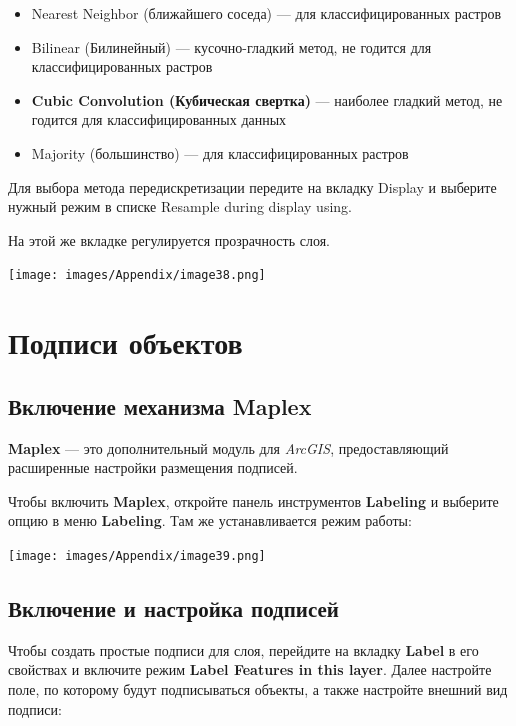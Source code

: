\documentclass[12pt,]{book}
\begin{document}
\begin{itemize}
\item
  Nearest Neighbor (ближайшего соседа) --- для классифицированных растров
\item
  Bilinear (Билинейный) --- кусочно-гладкий метод, не годится для классифицированных растров
\item
  \textbf{Cubic Convolution (Кубическая свертка)} --- наиболее гладкий метод, не годится для классифицированных данных
\item
  Majority (большинство) --- для классифицированных растров
\end{itemize}

Для выбора метода передискретизации передите на вкладку Display и выберите нужный режим в списке Resample during display using.

На этой же вкладке регулируется прозрачность слоя.

\texttt{[image: images/Appendix/image38.png]}

\hypertarget{manual-labels}{%
\chapter{Подписи объектов}\label{manual-labels}}

\hypertarget{maplex}{%
\section{Включение механизма Maplex}\label{maplex}}

\textbf{Maplex} --- это дополнительный модуль для \emph{ArcGIS}, предоставляющий расширенные настройки размещения подписей.

Чтобы включить \textbf{Maplex}, откройте панель инструментов \textbf{Labeling} и выберите опцию в меню \textbf{Labeling}. Там же устанавливается режим работы:

\texttt{[image: images/Appendix/image39.png]}

\hypertarget{section-24}{%
\section{Включение и настройка подписей}\label{section-24}}

Чтобы создать простые подписи для слоя, перейдите на вкладку \textbf{Label} в его свойствах и включите режим \textbf{Label Features in this layer}. Далее настройте поле, по которому будут подписываться объекты, а также настройте внешний вид подписи:
\end{document}
